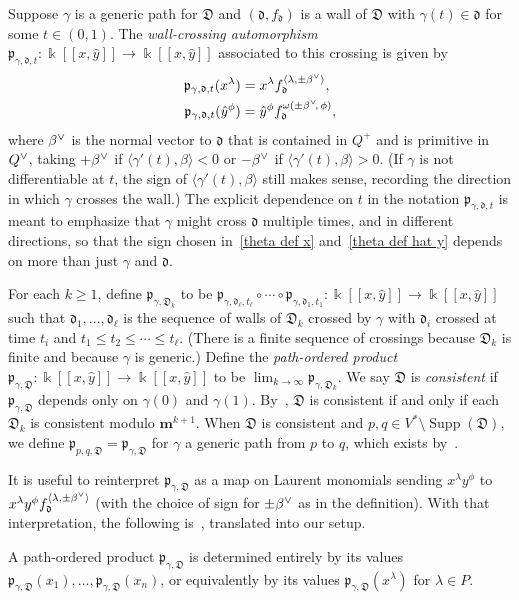 \documentclass[ALCO,ThmDefs,Unicode,epreuves]{cedram}
\DeclareMathOperator{\Supp}{Supp}
\newcommand{\newword}[1]{\emph{#1}}
\newcommand\llbracket{[\![}
\newcommand\rrbracket{]\!]}
\newcommand{\br}[1]{{\langle #1 \rangle}}
\newcommand{\D}{{\mathfrak D}}
\newcommand{\p}{{\mathfrak p}}
\newcommand{\ck}{\spcheck}
\newcommand{\m}{\mathbf{m}}
\renewcommand{\k}{\Bbbk}
\renewcommand{\d}{{\mathfrak d}}
\newcommand{\hy}{\hat{y}}
\begin{document}
Suppose $\gamma$ is a generic path for $\D$ and $(\d,f_\d)$ is a wall of $\D$ with $\gamma(t)\in\d$ for some $t\in(0,1)$.
The \newword{wall-crossing automorphism} $\p_{\gamma,\d,t}:\k\llbracket x,\hy\rrbracket \to\k\llbracket x,\hat y\rrbracket $ associated to this crossing is given by 
\begin{align}
\label{theta def x}
\p_{\gamma,\d,t}(x^\lambda)&=x^\lambda f_\d^{\br{\lambda,\pm\beta\ck}},\\
\label{theta def hat y}
\p_{\gamma,\d,t}(\hy^\phi)&=\hy^\phi f_\d^{\omega(\pm\beta\ck\!,\,\phi)},
\end{align}
where $\beta\ck$ is the normal vector to $\d$ that is contained in $Q^+$ and is primitive in $Q\ck$, taking $+\beta\ck$ if $\br{\gamma'(t),\beta}<0$ or $-\beta\ck$ if $\br{\gamma'(t),\beta}>0$.
(If $\gamma$ is not differentiable at $t$, the sign of $\br{\gamma'(t),\beta}$ still makes sense, recording the direction in which $\gamma$ crosses the wall.)
The explicit dependence on $t$ in the notation $\p_{\gamma,\d,t}$ is meant to emphasize that $\gamma$ might cross $\d$ multiple times, and in different directions, so that the sign chosen in~\eqref{theta def x} and~\eqref{theta def hat y} depends on more than just $\gamma$ and $\d$.

For each $k\ge 1$, define $\p_{\gamma,\D_k}$ to be $\p_{\gamma,\d_\ell,t_\ell}\circ\cdots\circ\p_{\gamma,\d_1,t_1}:\k\llbracket x,\hy\rrbracket \to\k\llbracket x,\hy\rrbracket $ such that $\d_1,\ldots,\d_\ell$ is the sequence of walls of $\D_k$ crossed by $\gamma$ with $\d_i$ crossed at time $t_i$ and $t_1\le t_2\le\cdots\le t_\ell$.
(There is a finite sequence of crossings because $\D_k$ is finite and because $\gamma$ is generic.)
Define the \newword{path-ordered product} $\p_{\gamma,\D}:\k\llbracket x,\hy\rrbracket \to\k\llbracket x,\hy\rrbracket $ to be $\lim_{k\to\infty}\p_{\gamma,\D_k}$.
We say $\D$ is \newword{consistent} if $\p_{\gamma,\D}$ depends only on $\gamma(0)$ and $\gamma(1)$.
By~\cite[Proposition~2.4]{scatfan}, $\D$ is consistent if and only if each $\D_k$ is consistent modulo $\m^{k+1}$.
When $\D$ is consistent and $p,q\in V^*\setminus\Supp(\D)$, we define $\p_{p,q,\D}=\p_{\gamma,\D}$ for $\gamma$ a generic path from $p$ to $q$, which exists by~\cite[Proposition~2.2]{scatfan}.

It is useful to reinterpret $\p_{\gamma,\D}$ as a map on Laurent monomials sending $x^\lambda y^\phi$ to $x^\lambda y^\phi f_\d^{\br{\lambda,\pm\beta\ck}}$ (with the choice of sign for $\pm\beta\ck$ as in the definition).
With that interpretation, the following is~\cite[Proposition~2.5]{scatfan}, translated into our setup.
\begin{prop}\label{just x's} 
A path-ordered product $\p_{\gamma,\D}$ is determined entirely by its values $\p_{\gamma,\D}(x_1),\ldots,\p_{\gamma,\D}(x_n)$, or equivalently by its values $\p_{\gamma,\D}(x^\lambda)$ for $\lambda\in P$.
\end{prop}
\end{document}
